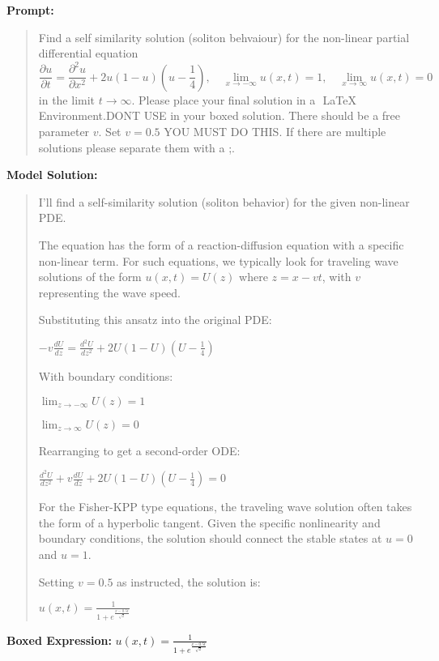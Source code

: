 \documentclass{article}
\begin{document}
\textbf{Prompt:}
\begin{quote}
Find a self similarity solution (soliton behvaiour) for the non-linear partial differential equation $$ \frac{\partial u}{\partial t} = \frac{\partial^2 u}{\partial x^2} + 2 u(1-u)(u-\frac{1}{4}), \quad \lim_{x \to -\infty} u(x,t) = 1, \quad \lim_{x \to \infty} u(x,t) = 0 $$ in the limit $t \rightarrow \infty $. Please place your final solution in a $\boxed{}$ LaTeX Environment.DONT USE \operatorname in your boxed solution. There should be a free parameter $v$. Set $v=0.5$ YOU MUST DO THIS. If there are multiple solutions please separate them with a ;.
\end{quote}
\textbf{Model Solution:}
\begin{quote}
I'll find a self-similarity solution (soliton behavior) for the given non-linear PDE.



The equation has the form of a reaction-diffusion equation with a specific non-linear term. For such equations, we typically look for traveling wave solutions of the form $u(x,t) = U(z)$ where $z = x - vt$, with $v$ representing the wave speed.



Substituting this ansatz into the original PDE:



$-v\frac{dU}{dz} = \frac{d^2U}{dz^2} + 2U(1-U)(U-\frac{1}{4})$



With boundary conditions:

$\lim_{z \to -\infty} U(z) = 1$

$\lim_{z \to \infty} U(z) = 0$



Rearranging to get a second-order ODE:

$\frac{d^2U}{dz^2} + v\frac{dU}{dz} + 2U(1-U)(U-\frac{1}{4}) = 0$



For the Fisher-KPP type equations, the traveling wave solution often takes the form of a hyperbolic tangent. Given the specific nonlinearity and boundary conditions, the solution should connect the stable states at $u=0$ and $u=1$.



Setting $v=0.5$ as instructed, the solution is:



$\boxed{u(x,t) = \frac{1}{1+e^{\frac{x-0.5t}{\sqrt{2}}}}}$
\end{quote}
\textbf{Boxed Expression:} $u(x,t) = \frac{1}{1+e^{\frac{x-0.5t}{\sqrt{2}}}}$
\end{document}
